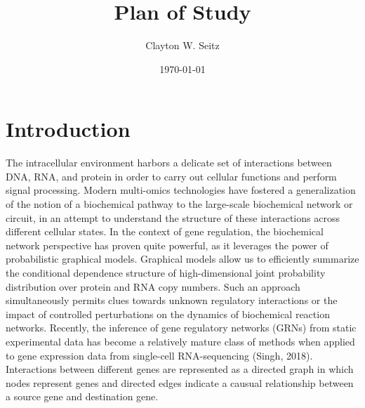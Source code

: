 \documentclass{article}
\title{Plan of Study}
\author{Clayton W. Seitz}
\date{\today}
\begin{document}
  \maketitle%
\vspace{0.4in}

\begin{abstract}
\end{abstract}

\section{Introduction}

The intracellular environment harbors a delicate set of interactions between DNA, RNA, and protein in order to carry out cellular functions and perform signal processing. Modern multi-omics technologies have fostered a generalization of the notion of a biochemical pathway to the large-scale biochemical network or circuit, in an attempt to understand the structure of these interactions across different cellular states. In the context of gene regulation, the biochemical network perspective has proven quite powerful, as it leverages the power of probabilistic graphical models. Graphical models allow us to efficiently summarize the conditional dependence structure of high-dimensional joint probability distribution over protein and RNA copy numbers. Such an approach simultaneously permits clues towards unknown regulatory interactions or the impact of controlled perturbations on the dynamics of biochemical reaction networks. Recently, the inference of gene regulatory networks (GRNs) from static experimental data has become a relatively mature class of methods when applied to gene expression data from single-cell RNA-sequencing (Singh, 2018). Interactions between different genes are represented as a directed graph in which nodes represent genes and directed edges indicate a causual relationship between a source gene and destination gene. 
\end{document}
